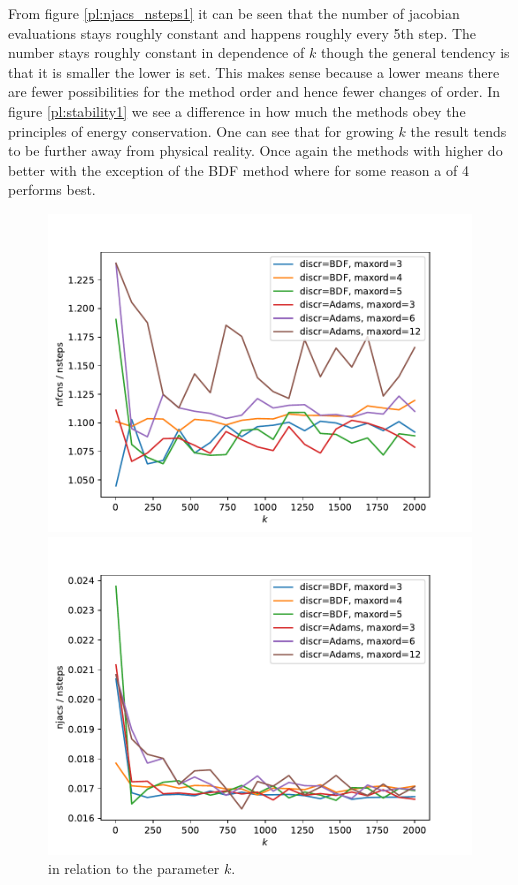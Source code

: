 \documentclass{scrartcl}
\newcounter{constant}
\begin{document}
From figure \ref{pl:njacs_nsteps1} it can be seen that the number of jacobian evaluations stays roughly constant and happens roughly every 5th step. The number  stays roughly constant in dependence of $k$ though the general tendency is that it is smaller the lower  is set. This makes sense because a lower  means there are fewer possibilities for the method order and hence fewer changes of order. In figure \ref{pl:stability1} we see a difference in how much the methods obey the principles of energy conservation. One can see that for growing $k$ the result tends to be further away from physical reality. Once again the methods with higher  do better with the exception of the BDF method where for some reason a  of 4 performs best.


\begin{figure}[h]
\centering
\begin{minipage}[b]{0.45\textwidth}
\centering
\includegraphics[width=\textwidth]{../Plots/Task4/Figure_210}
\caption{ in relation to the parameter $k$.}
\label{pl:nfcns_nsteps1}
\end{minipage}
\hfill
\begin{minipage}[b]{0.45\textwidth}
\centering
\includegraphics[width=\textwidth]{../Plots/Task4/Figure_211}

\end{minipage}
\end{figure}
\end{document}
